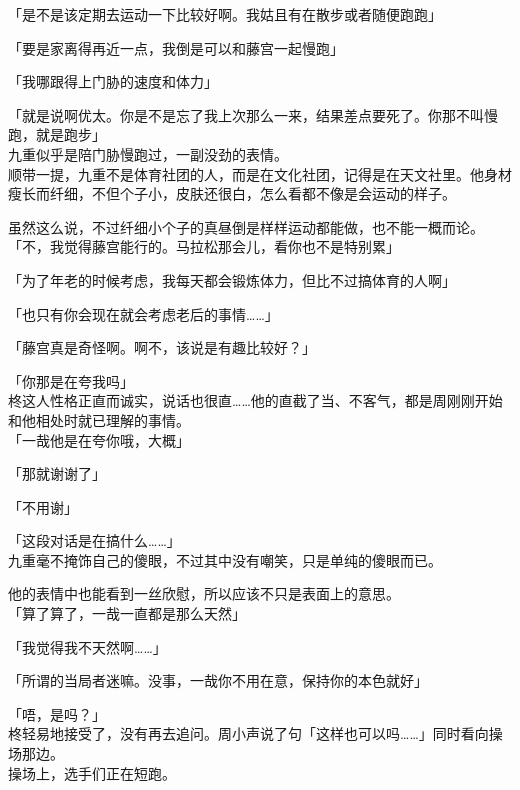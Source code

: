 「是不是该定期去运动一下比较好啊。我姑且有在散步或者随便跑跑」

「要是家离得再近一点，我倒是可以和藤宫一起慢跑」

「我哪跟得上门胁的速度和体力」

「就是说啊优太。你是不是忘了我上次那么一来，结果差点要死了。你那不叫慢跑，就是跑步」\\

九重似乎是陪门胁慢跑过，一副没劲的表情。\\

顺带一提，九重不是体育社团的人，而是在文化社团，记得是在天文社里。他身材瘦长而纤细，不但个子小，皮肤还很白，怎么看都不像是会运动的样子。

虽然这么说，不过纤细小个子的真昼倒是样样运动都能做，也不能一概而论。\\

「不，我觉得藤宫能行的。马拉松那会儿，看你也不是特别累」

「为了年老的时候考虑，我每天都会锻炼体力，但比不过搞体育的人啊」

「也只有你会现在就会考虑老后的事情……」

「藤宫真是奇怪啊。啊不，该说是有趣比较好？」

「你那是在夸我吗」\\

柊这人性格正直而诚实，说话也很直……他的直截了当、不客气，都是周刚刚开始和他相处时就已理解的事情。\\

「一哉他是在夸你哦，大概」

「那就谢谢了」

「不用谢」

「这段对话是在搞什么……」\\

九重毫不掩饰自己的傻眼，不过其中没有嘲笑，只是单纯的傻眼而已。

他的表情中也能看到一丝欣慰，所以应该不只是表面上的意思。\\

「算了算了，一哉一直都是那么天然」

「我觉得我不天然啊……」

「所谓的当局者迷嘛。没事，一哉你不用在意，保持你的本色就好」

「唔，是吗？」\\

柊轻易地接受了，没有再去追问。周小声说了句「这样也可以吗……」同时看向操场那边。\\

操场上，选手们正在短跑。\\

